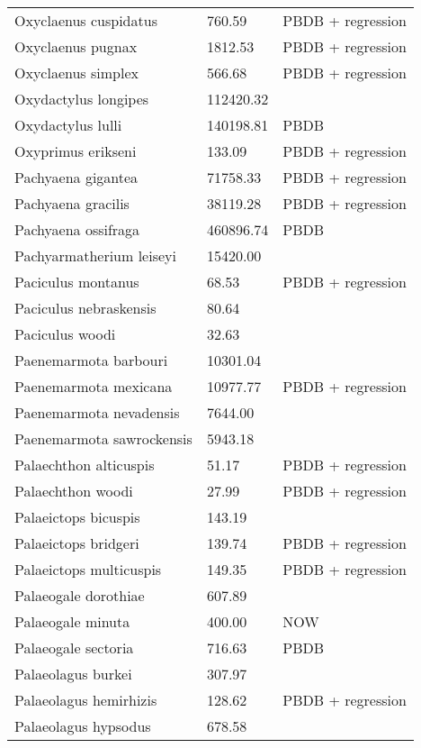 \documentclass{article}
\begin{document}
\begin{center}
\begin{longtable}{p{} p{} p{} }
  Oxyclaenus cuspidatus & 760.59 & PBDB + regression \\ 
  Oxyclaenus pugnax & 1812.53 & PBDB + regression \\ 
  Oxyclaenus simplex & 566.68 & PBDB + regression \\ 
  Oxydactylus longipes & 112420.32 & \cite{Tomiya2013} \\ 
  Oxydactylus lulli & 140198.81 & PBDB \\ 
  Oxyprimus erikseni & 133.09 & PBDB + regression \\ 
  Pachyaena gigantea & 71758.33 & PBDB + regression \\ 
  Pachyaena gracilis & 38119.28 & PBDB + regression \\ 
  Pachyaena ossifraga & 460896.74 & PBDB \\ 
  Pachyarmatherium leiseyi & 15420.00 & \cite{McDonald2005} \\ 
  Paciculus montanus & 68.53 & PBDB + regression \\ 
  Paciculus nebraskensis & 80.64 & \cite{Tomiya2013} \\ 
  Paciculus woodi & 32.63 & \cite{Korth1993} \\ 
  Paenemarmota barbouri & 10301.04 & \cite{Tomiya2013} \\ 
  Paenemarmota mexicana & 10977.77 & PBDB + regression \\ 
  Paenemarmota nevadensis & 7644.00 & \cite{McKenna2011} \\ 
  Paenemarmota sawrockensis & 5943.18 & \cite{Tomiya2013} \\ 
  Palaechthon alticuspis & 51.17 & PBDB + regression \\ 
  Palaechthon woodi & 27.99 & PBDB + regression \\ 
  Palaeictops bicuspis & 143.19 & \cite{Simons1960} \\ 
  Palaeictops bridgeri & 139.74 & PBDB + regression \\ 
  Palaeictops multicuspis & 149.35 & PBDB + regression \\ 
  Palaeogale dorothiae & 607.89 & \cite{Tomiya2013} \\ 
  Palaeogale minuta & 400.00 & NOW \\ 
  Palaeogale sectoria & 716.63 & PBDB \\ 
  Palaeolagus burkei & 307.97 & \cite{Tomiya2013} \\ 
  Palaeolagus hemirhizis & 128.62 & PBDB + regression \\ 
  Palaeolagus hypsodus & 678.58 & \cite{Tomiya2013} \\ 

\end{longtable}
\end{center}
\end{document}
